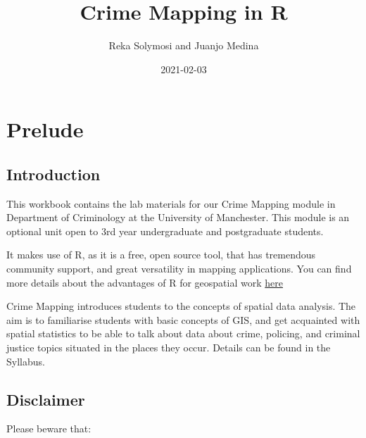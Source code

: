 \documentclass[
]{book}
\title{Crime Mapping in R}
\author{Reka Solymosi and Juanjo Medina}
\date{2021-02-03}
\begin{document}
\maketitle

{
\setcounter{tocdepth}{1}
\tableofcontents
}
\hypertarget{prelude}{%
\chapter*{Prelude}\label{prelude}}

\hypertarget{introduction}{%
\section{Introduction}\label{introduction}}

This workbook contains the lab materials for our Crime Mapping module in Department of Criminology at the University of Manchester. This module is an optional unit open to 3rd year undergraduate and postgraduate students.

It makes use of R, as it is a free, open source tool, that has tremendous community support, and great versatility in mapping applications. You can find more details about the advantages of R for geospatial work \href{https://geocompr.robinlovelace.net/intro.html}{here}

Crime Mapping introduces students to the concepts of spatial data analysis. The aim is to familiarise students with basic concepts of GIS, and get acquainted with spatial statistics to be able to talk about data about crime, policing, and criminal justice topics situated in the places they occur. Details can be found in the Syllabus.

\hypertarget{disclaimer}{%
\section{Disclaimer}\label{disclaimer}}

Please beware that:
\end{document}
